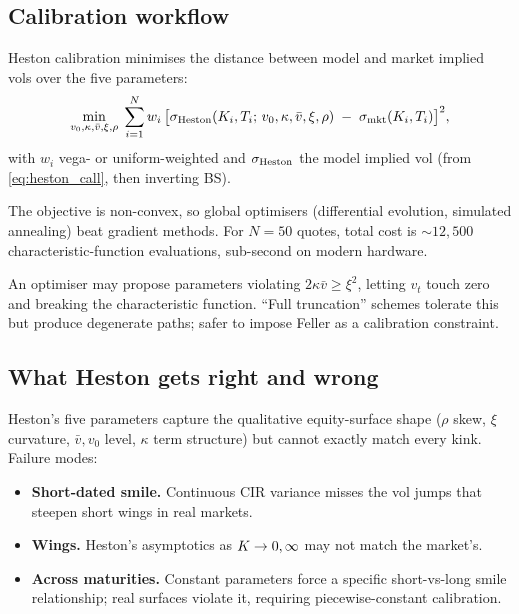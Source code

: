 \subsection{Calibration workflow}
\label{subsec:heston_calib}

Heston calibration minimises the distance between model and market
implied vols over the five parameters:
\begin{equation}
  \min_{v_0, \kappa, \bar{v}, \xi, \rho}\;
  \sum_{i=1}^{N}
    w_i\,\bigl[
      \sigma_{\text{Heston}}(K_i, T_i;\, v_0, \kappa, \bar{v}, \xi, \rho)
      \;-\;
      \sigma_{\text{mkt}}(K_i, T_i)
    \bigr]^2,
  \label{eq:heston_calib}
\end{equation}
with $w_i$ vega- or uniform-weighted and $\sigma_{\text{Heston}}$ the
model implied vol (from \cref{eq:heston_call}, then inverting BS).

The objective is non-convex, so global optimisers (differential
evolution, simulated annealing) beat gradient methods. For $N=50$
quotes, total cost is $\sim 12{,}500$ characteristic-function
evaluations, sub-second on modern hardware.

\begin{pitfallbox}
An optimiser may propose parameters violating $2\kappa\bar v\geq\xi^2$,
letting $v_t$ touch zero and breaking the characteristic function.
``Full truncation'' schemes tolerate this but produce degenerate
paths; safer to impose Feller as a calibration constraint.
\end{pitfallbox}

\subsection{What Heston gets right and wrong}
\label{subsec:heston_tradeoffs}

Heston's five parameters capture the qualitative equity-surface shape
($\rho$ skew, $\xi$ curvature, $\bar v, v_0$ level, $\kappa$ term
structure) but cannot exactly match every kink. Failure modes:

\begin{itemize}
  \item \textbf{Short-dated smile.} Continuous CIR variance misses
    the vol jumps that steepen short wings in real markets.
  \item \textbf{Wings.} Heston's asymptotics as $K\to 0,\infty$
    may not match the market's.
  \item \textbf{Across maturities.} Constant parameters force a
    specific short-vs-long smile relationship; real surfaces violate
    it, requiring piecewise-constant calibration.
\end{itemize}

